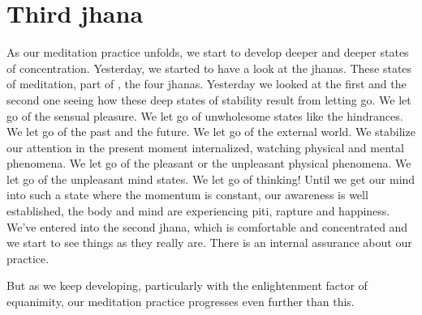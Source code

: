 \documentclass[letterpaper,10pt,english]{sphinxmanual}
\begin{document}
\section{Third jhana}
\label{\detokenize{7-a:third-jhana}}
\sphinxAtStartPar
As  our  meditation  practice  unfolds,  we  start  to  develop  deeper  and
deeper  states  of  concentration. Yesterday,  we  started  to  have  a  look  at  the
jhanas. These states of meditation, part of
, the four jhanas.
Yesterday we looked at the first and the second one seeing how these deep
states of stability result from letting go. We let go of the sensual pleasure.
We let go of unwholesome states like the hindrances. We let go of the past
and the future. We let go of the external world. We stabilize our attention in
the present moment internalized, watching physical and mental phenomena.
We let go of the pleasant or the unpleasant physical phenomena. We let go
of the unpleasant mind states. We let go of thinking! Until we get our mind
into  such  a  state  where  the  momentum  is  constant,  our  awareness  is  well
established, the body and mind are experiencing piti, rapture and happiness.
We’ve entered into the second jhana, which is comfortable and concentrated
and we start to see things as they really are. There is an internal assurance
about our practice.

\sphinxAtStartPar
But as we keep developing, particularly with the enlightenment factor
of equanimity, our meditation practice progresses even further than this.

\sphinxAtStartPar
{}
\end{document}
